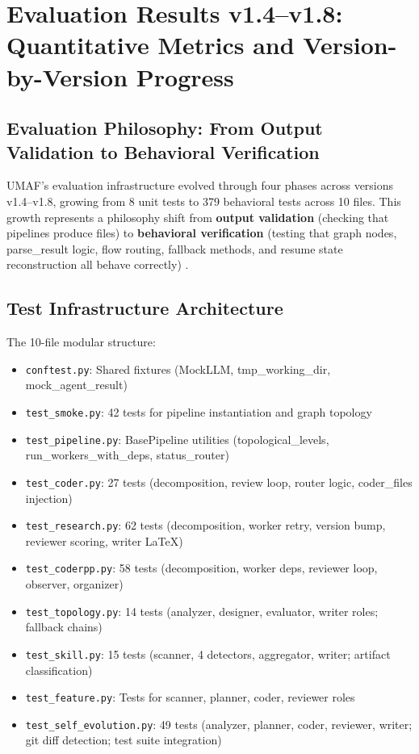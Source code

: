 \section{Evaluation Results v1.4--v1.8: Quantitative Metrics and Version-by-Version Progress}
\label{sec:evaluation}

\subsection{Evaluation Philosophy: From Output Validation to Behavioral Verification}

UMAF's evaluation infrastructure evolved through four phases across versions v1.4--v1.8, growing from 8 unit tests to 379 behavioral tests across 10 files. This growth represents a philosophy shift from \textbf{output validation} (checking that pipelines produce files) to \textbf{behavioral verification} (testing that graph nodes, parse\_result logic, flow routing, fallback methods, and resume state reconstruction all behave correctly) \cite{evaluatingcompound}.

\subsection{Test Infrastructure Architecture}

The 10-file modular structure:
\begin{itemize}
    \item \texttt{conftest.py}: Shared fixtures (MockLLM, tmp\_working\_dir, mock\_agent\_result)
    \item \texttt{test\_smoke.py}: 42 tests for pipeline instantiation and graph topology
    \item \texttt{test\_pipeline.py}: BasePipeline utilities (topological\_levels, run\_workers\_with\_deps, status\_router)
    \item \texttt{test\_coder.py}: 27 tests (decomposition, review loop, router logic, coder\_files injection)
    \item \texttt{test\_research.py}: 62 tests (decomposition, worker retry, version bump, reviewer scoring, writer LaTeX)
    \item \texttt{test\_coderpp.py}: 58 tests (decomposition, worker deps, reviewer loop, observer, organizer)
    \item \texttt{test\_topology.py}: 14 tests (analyzer, designer, evaluator, writer roles; fallback chains)
    \item \texttt{test\_skill.py}: 15 tests (scanner, 4 detectors, aggregator, writer; artifact classification)
    \item \texttt{test\_feature.py}: Tests for scanner, planner, coder, reviewer roles
    \item \texttt{test\_self\_evolution.py}: 49 tests (analyzer, planner, coder, reviewer, writer; git diff detection; test suite integration)
\end{itemize}

